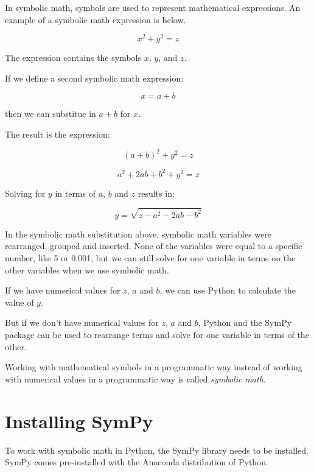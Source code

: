 \documentclass{book}
\begin{document}
In symbolic math, symbols are used to represent mathematical
expressions. An example of a symbolic math expression is below.

\[ x^{2} + y^{2} = z \]

The expression contains the symbols \(x\), \(y\), and \(z\).

If we define a second symbolic math expression:

\[ x = a + b \]

then we can substitue in \(a + b\) for \(x\).

The result is the expression:

\[ (a + b)^{2} + y^{2} = z \]

\[ a^{2} + 2ab + b^{2} + y^{2} = z \]

Solving for \(y\) in terms of \(a\), \(b\) and \(z\) results in:

\[ y = \sqrt{z - a^{2} - 2ab - b^{2}} \]

In the symbolic math substitution above, symbolic math variables were
rearranged, grouped and inserted. None of the variables were equal to a
specific number, like 5 or 0.001, but we can still solve for one
variable in terms on the other variables when we use symbolic math.
    




    
        If we have numerical values for \(z\), \(a\) and \(b\), we can use
Python to calculate the value of \(y\).

But if we don't have numerical values for \(z\), \(a\) and \(b\), Python
and the SymPy package can be used to rearrange terms and solve for one
variable in terms of the other.

Working with mathematical symbols in a programmatic way instead of
working with numerical values in a programmatic way is called
\emph{symbolic math}.
    




    
        \hypertarget{installing-sympy}{%
\section{Installing SymPy}\label{installing-sympy}}
    




    
        To work with symbolic math in Python, the SymPy library needs to be
installed. SymPy comes pre-installed with the Anaconda distribution of
Python.
    
\end{document}
